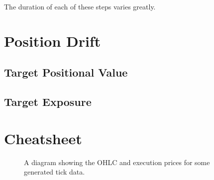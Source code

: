 The duration of each of these steps varies greatly. 

\section{Position Drift}
\label{sec:pos-drift}
\subsection{Target Positional Value}

\subsection{Target Exposure}

\section{Cheatsheet}

\begin{figure}[t!]
    \centering
     
    \caption{A diagram showing the OHLC and execution prices for some generated tick data.}
    \label{fig:trading_diagram}
\end{figure}

